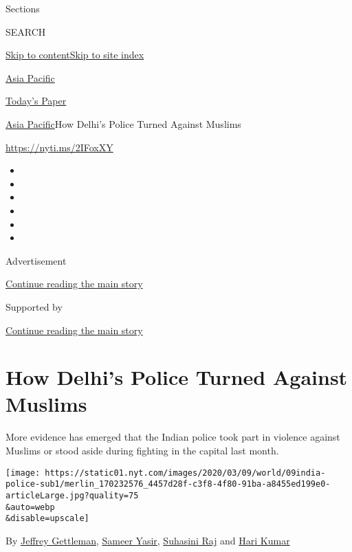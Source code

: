 Sections

SEARCH

\protect\hyperlink{site-content}{Skip to
content}\protect\hyperlink{site-index}{Skip to site index}

\href{https://www.nytimes.com/section/world/asia}{Asia Pacific}

\href{https://myaccount.nytimes.com/auth/login?response_type=cookie\&client_id=vi}{}

\href{https://www.nytimes.com/section/todayspaper}{Today's Paper}

\href{/section/world/asia}{Asia Pacific}\textbar{}How Delhi's Police
Turned Against Muslims

\url{https://nyti.ms/2IFoxXY}

\begin{itemize}
\item
\item
\item
\item
\item
\item
\end{itemize}

Advertisement

\protect\hyperlink{after-top}{Continue reading the main story}

Supported by

\protect\hyperlink{after-sponsor}{Continue reading the main story}

\hypertarget{how-delhis-police-turned-against-muslims}{%
\section{How Delhi's Police Turned Against
Muslims}\label{how-delhis-police-turned-against-muslims}}

More evidence has emerged that the Indian police took part in violence
against Muslims or stood aside during fighting in the capital last
month.

\texttt{[image: https://static01.nyt.com/images/2020/03/09/world/09india-police-sub1/merlin\_170232576\_4457d28f-c3f8-4f80-91ba-a8455ed199e0-articleLarge.jpg?quality=75\\\&auto=webp\\\&disable=upscale]}

By \href{https://www.nytimes.com/by/jeffrey-gettleman}{Jeffrey
Gettleman}, \href{https://www.nytimes.com/by/sameer-yasir}{Sameer
Yasir}, \href{https://www.nytimes.com/by/suhasini-raj}{Suhasini Raj} and
\href{https://www.nytimes.com/by/hari-kumar}{Hari Kumar}

